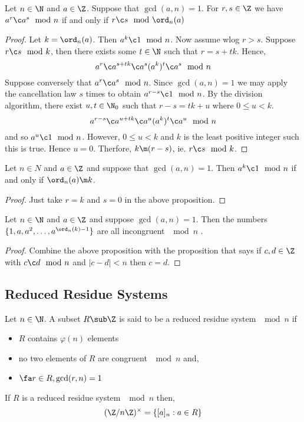 \begin{nprop}
   Let $n \in \N$ and $a\in \Z$. Suppose that $\gcd(a, n) = 1$. For $r, s \in \Z$ we have $a^r \c a^s \mod n$ if and only if $r \c s \mod \ord_n(a)$
\end{nprop}
\begin{proof}
  Let $k =\ord_n(a)$. Then $a^k \c 1 \mod n$. Now assume wlog $r > s$. Suppose $r \c s \mod k$, then there exists some $t \in \N$ such that $r = s + tk$. Hence,
  $$ a^r \c a^{s + tk} \c a^s(a^k)^t \c a^s \mod n $$
  Suppose conversely that $a^r \c a^s \mod n$. Since $\gcd(a, n)= 1$ we may apply the cancellation law $s$ times to obtain $a^{r - s}\c 1 \mod n$. By the division algorithm, there exist $u, t \in \N_0$ such that $r - s = tk + u$ where $0 \le u < k$.\\
  $$ a^{r-s} \c a^{u+tk} \c a^u(a^k)^t \c a^u\mod n $$
  and so $a^u\c 1 \mod n$. However, $0 \le u  < k$ and $k$ is the least positive integer such this is true. Hence $u = 0$. Therfore, $k \m (r - s)$, ie. $r \c s \mod k$.
\end{proof}

\begin{ncor}
   Let $n \in N$ and $a \in \Z$ and suppose that $\gcd(a, n) = 1$. Then $a^k \c 1 \mod n$ if and only if $\ord_n(a) \m k$.
\end{ncor}
\begin{proof}
  Just take $r = k$ and $s = 0$ in the above proposition.
\end{proof}

\begin{ncor}
   Let $n \in \N$ and $a \in \Z$ and suppose $\gcd(a, n) = 1$. Then the numbers $\{1, a, a^2,\dots, a^{\ord_n(k) - 1}\}$ are all incongruent $\mod n$ .
\end{ncor}
\begin{proof}
  Combine the above proposition with the proposition that says if $c, d \in \Z$ with $c \c d \mod n$ and $|c - d| < n$ then $c = d$.
\end{proof}

\subsection{Reduced Residue Systems}

\begin{ndefi}
  Let $n \in \N$. A subset $R \sub \Z$ is said to be a reduced residue system $\mod n$ if
  \begin{itemize}
    \item $R$ contains $\varphi(n)$ elements
    \item no two elements of $R$ are congruent $\mod n$ and,
    \item $\fa r \in R, \gcd(r, n) = 1$
  \end{itemize}
\end{ndefi}
\begin{remark}
   If $R$ is a reduced residue system $\mod n$ then,
   $$ (\Z/n\Z)^\times = \{[a]_n : a \in R\} $$
\end{remark}

